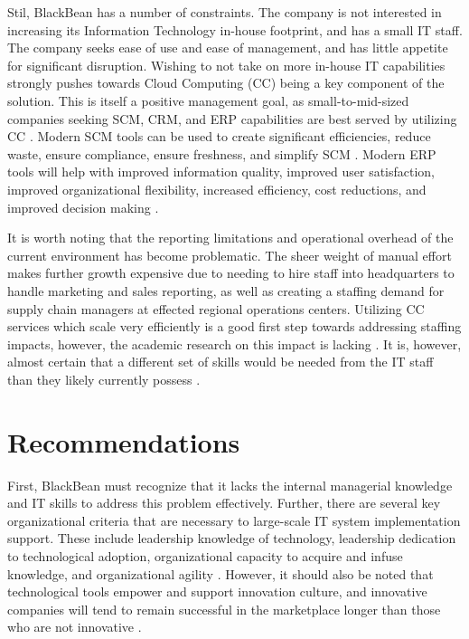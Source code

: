 Stil, BlackBean  has a number of constraints. The company is not interested in increasing its Information Technology in-house footprint, and has a small IT staff. The company seeks ease of use and ease of management, and has little appetite for significant disruption. Wishing to not take on more in-house IT capabilities strongly pushes towards Cloud Computing (CC) being a key component of the solution. This is itself a positive management goal, as small-to-mid-sized companies seeking SCM, CRM, and ERP capabilities are best served by utilizing CC \parencite{taliaCloudsScalableBig2013}. Modern SCM tools can be used to create significant efficiencies, reduce waste, ensure compliance, ensure freshness, and simplify SCM \parencite{aviles-sacotoGlanceIndustrySupply2019,daneshvarEffectiveFactorsImplementing2020,divaioBlockchainTechnologySupply2020,fossowambaDynamicsBlockchainAdoption2020,gaurBuildingTransparentSupply2020a}. Modern ERP tools will help with improved information quality, improved user satisfaction, improved organizational flexibility, increased efficiency, cost reductions, and improved decision making \parencite{hadidiSystematicApproachERP2017}.

It is worth noting that the reporting limitations and operational overhead of the current environment has become problematic. The sheer weight of manual effort makes further growth expensive due to needing to hire staff into headquarters to handle marketing and sales reporting, as well as creating a staffing demand for supply chain managers at effected regional operations centers. Utilizing CC services which scale very efficiently is a good first step towards addressing staffing impacts, however, the academic research on this impact is lacking \parencite{nieuwenhuisShiftCloudComputing2018}. It is, however, almost certain that a different set of skills would be needed from the IT staff than they likely currently possess \parencite{marquisImpactCloudComputing}.

\section{Recommendations}

First, BlackBean must recognize that it lacks the internal managerial knowledge and IT skills to address this problem effectively. Further, there are several key organizational criteria that are necessary to large-scale IT system implementation support. These include leadership knowledge of technology, leadership dedication to technological adoption, organizational capacity to acquire and infuse knowledge, and organizational agility \parencite{aliEmpiricalStudyExplore2019,bagKeyResourcesIndustry2021}. However, it should also be noted that technological tools empower and support innovation culture, and innovative companies will tend to remain successful in the marketplace longer than those who are not innovative \parencite{ahmadImpactWorkplaceInformation2020,nevoExploringRoleIT2020}.

